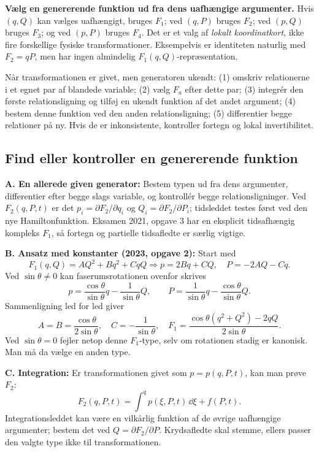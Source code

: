 \textbf{Vælg en genererende funktion ud fra dens uafhængige argumenter.}
Hvis $(q,Q)$ kan vælges uafhængigt, bruges $F_1$; ved $(q,P)$ bruges $F_2$; ved $(p,Q)$ bruges $F_3$; og ved $(p,P)$ bruges $F_4$. Det er et valg af \emph{lokalt koordinatkort}, ikke fire forskellige fysiske transformationer. Eksempelvis er identiteten naturlig med $F_2=qP$, men har ingen almindelig $F_1(q,Q)$-repræsentation.
\begin{method}Når transformationen er givet, men generatoren ukendt: (1) omskriv relationerne i et egnet par af blandede variable; (2) vælg $F_a$ efter dette par; (3) integrér den første relationsligning og tilføj en ukendt funktion af det andet argument; (4) bestem denne funktion ved den anden relationsligning; (5) differentier begge relationer på ny. Hvis de er inkonsistente, kontroller fortegn og lokal invertibilitet.\end{method}

\subsection{Find eller kontroller en genererende funktion}\label{sec:findgen}
\textbf{A. En allerede given generator:} Bestem typen ud fra dens argumenter, differentier efter begge slags variable, og kontrollér begge relationsligninger. Ved $F_2(q,P,t)$ er det
$p_i=\partial F_2/\partial q_i$ og $Q_i=\partial F_2/\partial P_i$; tidsleddet testes først ved den nye Hamiltonfunktion. Eksamen 2021, opgave 3 har en eksplicit tidsafhængig kompleks $F_1$, så fortegn og partielle tidsafledte er særlig vigtige.

\textbf{B. Ansatz med konstanter (2023, opgave 2):} Start med
\[
F_1(q,Q)=AQ^2+Bq^2+CqQ
\Longrightarrow
p=2Bq+CQ,\quad P=-2AQ-Cq.
\]
Ved $\sin\theta\ne0$ kan faserumsrotationen ovenfor skrives
\[
p=\frac{\cos\theta}{\sin\theta}q-\frac{1}{\sin\theta}Q,\qquad
P=\frac{1}{\sin\theta}q-\frac{\cos\theta}{\sin\theta}Q.
\]
Sammenligning led for led giver
\[
\boxed{A=B=\frac{\cos\theta}{2\sin\theta},\quad C=-\frac1{\sin\theta},\quad
F_1=\frac{\cos\theta(q^2+Q^2)-2qQ}{2\sin\theta}.}
\]
Ved $\sin\theta=0$ fejler netop denne $F_1$-type, selv om rotationen stadig er kanonisk. Man må da vælge en anden type.

\textbf{C. Integration:} Er transformationen givet som $p=p(q,P,t)$, kan man prøve $F_2$:
\[
F_2(q,P,t)=\int^q p(\xi,P,t)\,\dd\xi+f(P,t).
\]
Integrationsleddet kan være en vilkårlig funktion af de øvrige uafhængige argumenter; bestem det ved $Q=\partial F_2/\partial P$. Krydsafledte skal stemme, ellers passer den valgte type ikke til transformationen.

